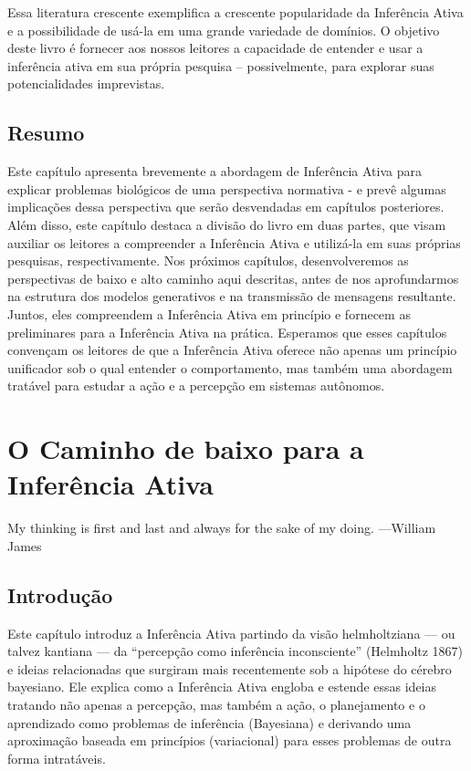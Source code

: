 \documentclass[
  12pt,
]{book}
\begin{document}
Essa literatura crescente exemplifica a crescente popularidade da Inferência Ativa e a possibilidade de usá-la em uma grande variedade de domínios. O objetivo deste livro é fornecer aos nossos leitores a capacidade de entender e usar a inferência ativa em sua própria pesquisa -- possivelmente, para explorar suas potencialidades imprevistas.

\hypertarget{resumo}{%
\section{Resumo}\label{resumo}}

Este capítulo apresenta brevemente a abordagem de Inferência Ativa para explicar problemas biológicos de uma perspectiva normativa - e prevê algumas implicações dessa perspectiva que serão desvendadas em capítulos posteriores. Além disso, este capítulo destaca a divisão do livro em duas partes, que visam auxiliar os leitores a compreender a Inferência Ativa e utilizá-la em suas próprias pesquisas, respectivamente. Nos próximos capítulos, desenvolveremos as perspectivas de baixo e alto caminho aqui descritas, antes de nos aprofundarmos na estrutura dos modelos generativos e na transmissão de mensagens resultante. Juntos, eles compreendem a Inferência Ativa em princípio e fornecem as preliminares para a Inferência Ativa na prática. Esperamos que esses capítulos convençam os leitores de que a Inferência Ativa oferece não apenas um princípio unificador sob o qual entender o comportamento, mas também uma abordagem tratável para estudar a ação e a percepção em sistemas autônomos.

\hypertarget{o-caminho-de-baixo-para-a-inferuxeancia-ativa}{%
\chapter{O Caminho de baixo para a Inferência Ativa}\label{o-caminho-de-baixo-para-a-inferuxeancia-ativa}}

My thinking is first and last and always for the sake of my ­doing. ---­William James

\hypertarget{introduuxe7uxe3o-1}{%
\section{Introdução}\label{introduuxe7uxe3o-1}}

Este capítulo introduz a Inferência Ativa partindo da visão helmholtziana --- ou talvez kantiana --- da ``percepção como inferência inconsciente'' (Helmholtz 1867) e ideias relacionadas que surgiram mais recentemente sob a hipótese do cérebro bayesiano. Ele explica como a Inferência Ativa engloba e estende essas ideias tratando não apenas a percepção, mas também a ação, o planejamento e o aprendizado como problemas de inferência (Bayesiana) e derivando uma aproximação baseada em princípios (variacional) para esses problemas de outra forma intratáveis.
\end{document}
